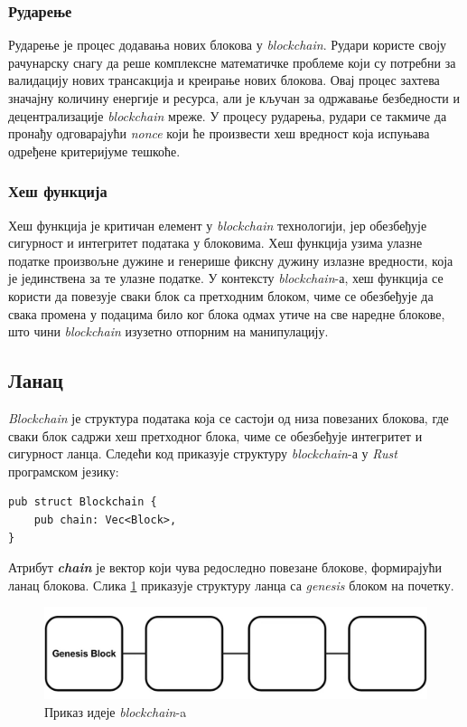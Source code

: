 \documentclass[12pt, a4paper]{article}
\begin{document}
\subsubsection{Рударење}
Рударење је процес додавања нових блокова у \textit{blockchain}. Рудари користе своју рачунарску снагу да реше комплексне математичке проблеме који су потребни за валидацију нових трансакција и креирање нових блокова. Овај процес захтева значајну количину енергије и ресурса, али је кључан за одржавање безбедности и децентрализације \textit{blockchain} мреже. У процесу рударења, рудари се такмиче да пронађу одговарајући \textit{nonce} који ће произвести хеш вредност која испуњава одређене критеријуме тешкоће.


\subsubsection{Хеш функција}
Хеш функција је критичан елемент у \textit{blockchain} технологији, јер обезбеђује сигурност и интегритет података у блоковима. Хеш функција узима улазне податке произвољне дужине и генерише фиксну дужину излазне вредности, која је јединствена за те улазне податке. У контексту \textit{blockchain}-а, хеш функција се користи да повезује сваки блок са претходним блоком, чиме се обезбеђује да свака промена у подацима било ког блока одмах утиче на све наредне блокове, што чини \textit{blockchain} изузетно отпорним на манипулацију.



\subsection{Ланац}
\textit{Blockchain} је структура података која се састоји од низа повезаних блокова, где сваки блок садржи хеш претходног блока, чиме се обезбеђује интегритет и сигурност ланца. Следећи код приказује структуру \textit{blockchain}-а у \textit{Rust} програмском језику:

\begin{verbatim}
pub struct Blockchain {
    pub chain: Vec<Block>,
}
\end{verbatim}

Атрибут \textit{\textbf{chain}} је вектор који чува редоследно повезане блокове, формирајући ланац блокова.
Слика \ref{fig:genesis-blockchain} приказује структуру ланца са \textit{genesis} блоком на почетку.
\begin{figure}[h]
    \centering
    \includegraphics[width=1\linewidth]{slike/blockchain.png}
    \caption{Приказ идеје \textit{blockchain}-a}
    \label{fig:genesis-blockchain}
\end{figure}
\end{document}
